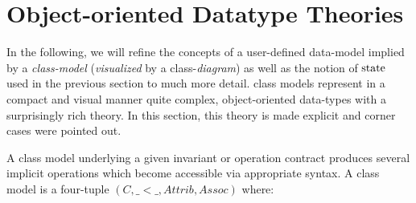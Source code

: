 \section{Object-oriented Datatype Theories}
In the following, we will refine the concepts of a user-defined
data-model implied by a \emph{class-model} (\emph{visualized} by a class-\emph{diagram})
as well as the notion of $\state{}$ used in the
previous section to much more detail.  \UML class models represent in a compact 
and visual manner quite complex, object-oriented data-types with a surprisingly rich
theory. In this section, this theory is made explicit
and corner cases were pointed out. 

A \UML class model underlying a
given \OCL invariant or operation contract
produces several implicit operations which
become accessible via appropriate \OCL syntax.
A class model is a four-tuple $(C, \_ < \_, Attrib, Assoc)$ where:

